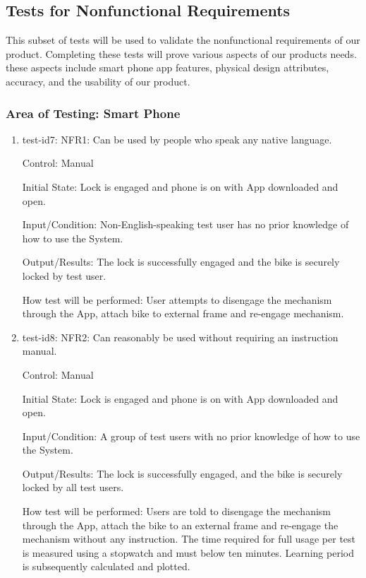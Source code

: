 \documentclass[12pt, titlepage]{article}
\begin{document}
\subsection{Tests for Nonfunctional Requirements}
\label{Section 5.2}

This subset of tests will be used to validate the nonfunctional requirements of our product. Completing these tests will prove various aspects of our products needs. these aspects include smart phone app features, physical design attributes, accuracy, and the usability of our product.

\subsubsection{Area of Testing: Smart Phone}

\begin{enumerate}

\item{test-id7: NFR1: Can be used by people who speak any native language. \\}

Control: Manual

Initial State: Lock is engaged and phone is on with App downloaded and open.

Input/Condition: Non-English-speaking test user has no prior knowledge of how to use the System.

Output/Results: The lock is successfully engaged and the bike is securely locked by test user.

How test will be performed: User attempts to disengage the mechanism through the App, attach bike to external frame and re-engage mechanism.
					
\item{test-id8: NFR2: Can reasonably be used without requiring an instruction manual. \\}

Control: Manual

Initial State: Lock is engaged and phone is on with App downloaded and open.

Input/Condition: A group of test users with no prior knowledge of how to use the System. 

Output/Results: The lock is successfully engaged, and the bike is securely locked by all test users.

How test will be performed: Users are told to disengage the mechanism through the App, attach the bike to an external frame and re-engage the mechanism without any instruction. The time required for full usage per test is measured using a stopwatch and must below ten minutes. Learning period is subsequently calculated and plotted. 


\end{enumerate}
\end{document}
